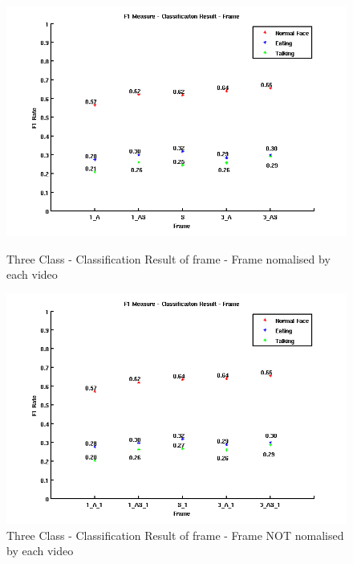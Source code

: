 \begin{figure}[ht]
\centering
\begin{minipage}{.5\textwidth}
  \centering
  \captionsetup{justification=centering,margin=1cm}
  \includegraphics[width=\linewidth]{imgs/Result_F1_Frame.png}
  \caption{Three Class - Classification Result of frame - Frame nomalised by each video}
  \label{fig:RFF}
\end{minipage}%
\begin{minipage}{.5\textwidth}
  \centering
  \captionsetup{justification=centering,margin=1cm}
  \includegraphics[width=\linewidth]{imgs/Result_F1_Frame_1.png}
  \caption{Three Class - Classification Result of frame - Frame NOT nomalised by each video}
  \label{fig:RFF1}
\end{minipage}
\end{figure}

